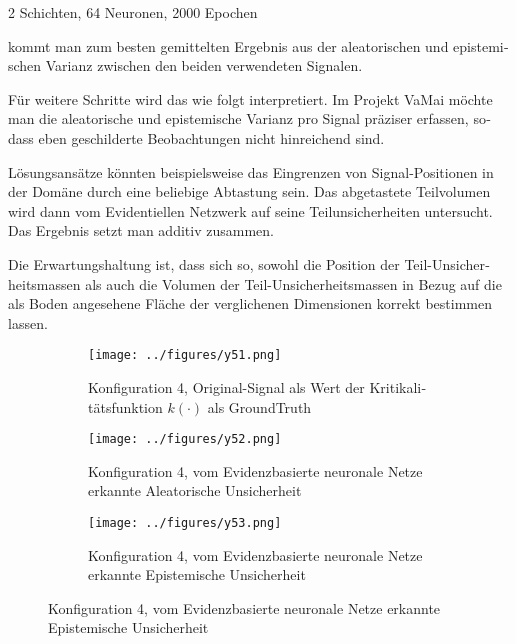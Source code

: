 \begin{otherlanguage}{ngerman}
2 Schichten, 64 Neuronen, 2000 Epochen 

kommt man zum besten gemittelten Ergebnis aus der aleatorischen und epistemischen Varianz zwischen den beiden verwendeten Signalen. 

Für weitere Schritte wird das wie folgt interpretiert. Im Projekt VaMai möchte man die aleatorische und epistemische Varianz pro Signal präziser erfassen, sodass eben geschilderte Beobachtungen nicht hinreichend sind. 

Lösungsansätze könnten beispielsweise das Eingrenzen von Signal-Positionen in der Domäne durch eine beliebige Abtastung sein. Das abgetastete Teilvolumen wird dann vom Evidentiellen Netzwerk auf seine Teilunsicherheiten untersucht. Das Ergebnis setzt man additiv zusammen. 

Die Erwartungshaltung ist, dass sich so, sowohl die Position der Teil-Unsicherheitsmassen als auch die Volumen der Teil-Unsicherheitsmassen in Bezug auf die als Boden angesehene Fläche der verglichenen Dimensionen korrekt bestimmen lassen. 



\begin{figure}[!ht]
  \centering

  \begin{subfigure}[t]{\textwidth}
    \centering
    \texttt{[image: ../figures/y51.png]}
    \caption{Konfiguration 4, Original-Signal als Wert der Kritikalitätsfunktion \(k(\cdot)\) als \gls{GroundTruth}}
    \label{fig:bild31}
  \end{subfigure}

  \vspace{0.5em}

  \begin{subfigure}[t]{\textwidth}
    \centering
    \texttt{[image: ../figures/y52.png]}
    \caption{Konfiguration 4, vom \gls{Evidenzbasierte neuronale Netze} erkannte \gls{Aleatorische Unsicherheit}}
    \label{fig:bild32}
  \end{subfigure}

  \vspace{0.5em}

  \begin{subfigure}[t]{\textwidth}
    \centering
    \texttt{[image: ../figures/y53.png]}
    \caption{Konfiguration 4, vom \gls{Evidenzbasierte neuronale Netze} erkannte \gls{Epistemische Unsicherheit}}
    \label{fig:bild33}
  \end{subfigure}


\end{figure}
\end{otherlanguage}
